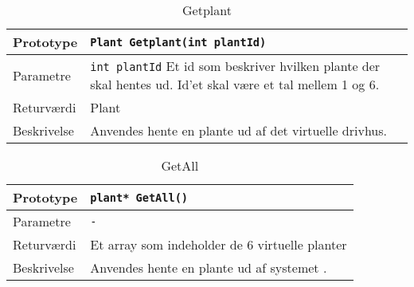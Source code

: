 \begin{table}[ht]
\begin{tabularx}{\textwidth}{| L{2.5 cm} | Z |} \hline
Prototype & \texttt{Plant Getplant(int plantId)} \\\hline
Parametre & \texttt{int plantId} \newline Et id som beskriver hvilken plante der skal hentes ud. Id'et skal være et tal mellem 1 og 6.
\newline
 \\\hline
Returværdi & Plant \\\hline
Beskrivelse & Anvendes hente en plante ud af det virtuelle drivhus.\\\hline
\end{tabularx}
\caption{Getplant}
\label{table:Indstillinger_Getplant}
\end{table}

\begin{table}[ht]
\begin{tabularx}{\textwidth}{| L{2.5 cm} | Z |} \hline
Prototype & \texttt{plant* GetAll()} \\\hline
Parametre & \texttt{-} \newline

 \\\hline
Returværdi & Et array som indeholder de 6 virtuelle planter \\\hline
Beskrivelse & Anvendes hente en plante ud af systemet .\\\hline
\end{tabularx}
\caption{GetAll}
\label{table:Indstillinger_GetAll}
\end{table}
